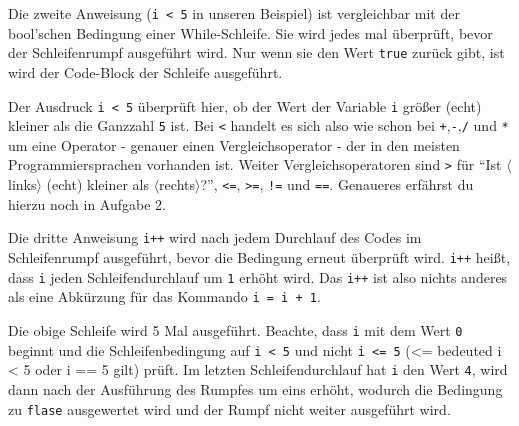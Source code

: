 \begin{Infobox}
	Die zweite Anweisung (\lstinline{i < 5} in unseren Beispiel) ist vergleichbar mit der bool'schen Bedingung einer While-Schleife.
	Sie wird jedes mal überprüft, bevor der Schleifenrumpf ausgeführt wird.
	Nur wenn sie den Wert \lstinline{true} zurück gibt, ist wird der Code-Block der Schleife ausgeführt.\newline

	Der Ausdruck \lstinline{i < 5} überprüft hier, ob der Wert der Variable \texttt{i} größer (echt) kleiner als die Ganzzahl \texttt{5} ist.
	Bei \texttt{<} handelt es sich also wie schon bei \texttt{+},\texttt{-},\texttt{/} und \texttt{*} um eine Operator - genauer einen Vergleichsoperator - der in den meisten Programmiersprachen vorhanden ist.
	Weiter Vergleichsoperatoren sind \texttt{>} für \enquote{Ist $\langle$links$\rangle$ (echt) kleiner als $\langle$rechts$\rangle$?}, \texttt{<=}, \texttt{>=}, \texttt{!=} und \texttt{==}.
	Genaueres erfährst du hierzu noch in Aufgabe 2.\newline

	Die dritte Anweisung \lstinline{i++} wird nach jedem Durchlauf des Codes im Schleifenrumpf ausgeführt, bevor die Bedingung erneut überprüft wird.
	\lstinline{i++} heißt, dass \lstinline{i} jeden Schleifendurchlauf um \lstinline{1} erhöht wird.
	Das \lstinline{i++} ist also nichts anderes als eine Abkürzung für das Kommando \lstinline{i = i + 1}.\newline

	Die obige Schleife wird 5 Mal ausgeführt.
	Beachte, dass \lstinline{i} mit dem Wert \lstinline{0} beginnt und die Schleifenbedingung auf \lstinline{i < 5} und nicht \lstinline{i <= 5} (<= bedeuted i < 5 oder i == 5 gilt) prüft.
	Im letzten Schleifendurchlauf hat \lstinline{i} den Wert \lstinline{4}, wird dann nach der Ausführung des Rumpfes um eins erhöht, wodurch die Bedingung zu \lstinline{flase} ausgewertet wird und der Rumpf nicht weiter ausgeführt wird.
\end{Infobox}


